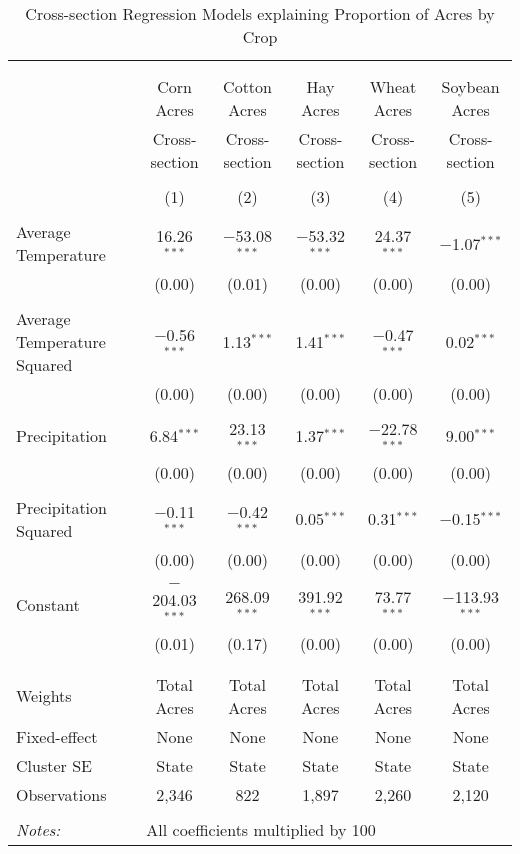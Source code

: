 \documentclass[10pt]{article}
\begin{document}
\newpage
\begin{table}[!htbp] \centering 
  \caption{Cross-section Regression Models explaining Proportion of Acres by Crop} 
  \label{} 
\footnotesize 
\begin{tabular}{@{\extracolsep{5pt}}lccccc} 
\\[-1.8ex]\hline 
\hline \\[-1.8ex] 
\\[-1.8ex] & Corn Acres & Cotton Acres & Hay Acres & Wheat Acres & Soybean Acres \\ 
 & Cross-section & Cross-section & Cross-section & Cross-section & Cross-section \\ 
\\[-1.8ex] & (1) & (2) & (3) & (4) & (5)\\ 
\hline \\[-1.8ex] 
 Average Temperature & 16.26$^{***}$ & $-$53.08$^{***}$ & $-$53.32$^{***}$ & 24.37$^{***}$ & $-$1.07$^{***}$ \\ 
  & (0.00) & (0.01) & (0.00) & (0.00) & (0.00) \\ 
  & & & & & \\ 
 Average Temperature Squared & $-$0.56$^{***}$ & 1.13$^{***}$ & 1.41$^{***}$ & $-$0.47$^{***}$ & 0.02$^{***}$ \\ 
  & (0.00) & (0.00) & (0.00) & (0.00) & (0.00) \\ 
  & & & & & \\ 
 Precipitation & 6.84$^{***}$ & 23.13$^{***}$ & 1.37$^{***}$ & $-$22.78$^{***}$ & 9.00$^{***}$ \\ 
  & (0.00) & (0.00) & (0.00) & (0.00) & (0.00) \\ 
  & & & & & \\ 
 Precipitation Squared & $-$0.11$^{***}$ & $-$0.42$^{***}$ & 0.05$^{***}$ & 0.31$^{***}$ & $-$0.15$^{***}$ \\ 
  & (0.00) & (0.00) & (0.00) & (0.00) & (0.00) \\ 
  & & & & & \\ 
 Constant & $-$204.03$^{***}$ & 268.09$^{***}$ & 391.92$^{***}$ & 73.77$^{***}$ & $-$113.93$^{***}$ \\ 
  & (0.01) & (0.17) & (0.00) & (0.00) & (0.00) \\ 
  & & & & & \\ 
\hline \\[-1.8ex] 
Weights & Total Acres & Total Acres & Total Acres & Total Acres & Total Acres \\ 
Fixed-effect & None & None & None & None & None \\ 
Cluster SE & State & State & State & State & State \\ 
Observations & 2,346 & 822 & 1,897 & 2,260 & 2,120 \\ 
\hline 
\hline \\[-1.8ex] 
\textit{Notes:} & \multicolumn{5}{l}{All coefficients multiplied by 100} \\ 
\end{tabular} 
\end{table} 
\end{document}
